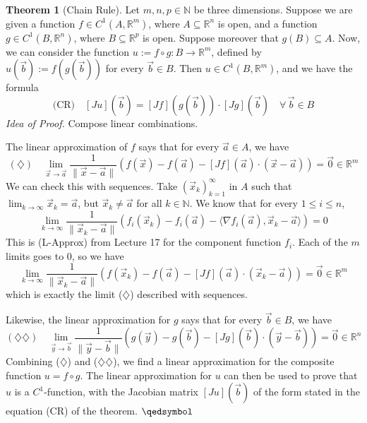 \documentclass[11pt]{article}
\theoremstyle{definition}
\newtheorem{thm}{Theorem}[section]
\newcommand{\N}{\ensuremath{\mathbb{N}}}
\newcommand{\R}{\ensuremath{\mathbb{R}}}
\begin{document}
\begin{thm}[Chain Rule]
Let $m, n, p \in \N$ be three dimensions. Suppose we are given a function $f \in C^1(A, \R^m)$, where $A \subseteq \R^n$ is open, and a function $g \in C^1(B, \R^n)$, where $B \subseteq \R^p$ is open. Suppose moreover that $g(B) \subseteq A$. Now, we can consider the function $u := f \circ g : B \to \R^m$, defined by $u(\vec{b}) := f(g(\vec{b}))$ for every $\vec{b} \in B$. Then $u \in C^1(B, \R^m)$, and we have the formula
$$\text{(CR)} \quad [Ju](\vec{b}) = [Jf](g(\vec{b})) \cdot [Jg](\vec{b}) \quad \forall \, \vec{b} \in B$$
\emph{Idea of Proof.} Compose linear combinations. 

The linear approximation of $f$ says that for every $\vec{a} \in A$, we have
$$(\diamondsuit) \quad \lim_{\vec{x}\to\vec{a}} \frac{1}{\|\vec{x}-\vec{a}\|}(f(\vec{x}) - f(\vec{a}) - [Jf](\vec{a}) \cdot (\vec{x} - \vec{a})) = \vec{0} \in \R^m$$
We can check this with sequences. Take $(\vec{x}_k)_{k=1}^\infty$ in $A$ such that $\lim_{k\to\infty} \vec{x}_k = \vec{a}$, but $\vec{x}_k \neq \vec{a}$ for all $k \in \N$. We know that for every $1 \leq i \leq n$,
$$\lim_{k\to\infty} \frac{1}{\|\vec{x}_k - \vec{a}\|} (f_i(\vec{x}_k) - f_i(\vec{a}) - \langle \nabla f_i(\vec{a}), \vec{x}_k - \vec{a} \rangle) = 0$$
This is (L-Approx) from Lecture 17 for the component function $f_i$. Each of the $m$ limits goes to 0, so we have
$$\lim_{k\to\infty} \frac{1}{\|\vec{x}_k - \vec{a}\|} (f(\vec{x}_k) - f(\vec{a}) - [Jf](\vec{a}) \cdot (\vec{x}_k - \vec{a})) = \vec{0} \in \R^m$$
which is exactly the limit ($\diamondsuit$) described with sequences.

Likewise, the linear approximation for $g$ says that for every $\vec{b} \in B$, we have
$$(\diamondsuit\diamondsuit) \quad \lim_{\vec{y}\to\vec{b}} \frac1{\|\vec{y}-\vec{b}\|}(g(\vec{y}) - g(\vec{b}) - [Jg](\vec{b}) \cdot (\vec{y} - \vec{b})) = \vec{0} \in \R^n$$
Combining ($\diamondsuit$) and ($\diamondsuit\diamondsuit$), we find a linear approximation for the composite function $u = f \circ g$. The linear approximation for $u$ can then be used to prove that $u$ is a $C^1$-function, with the Jacobian matrix $[Ju](\vec{b})$ of the form stated in the equation (CR) of the theorem. \hfill $\qedsymbol$
\end{thm}
\end{document}
